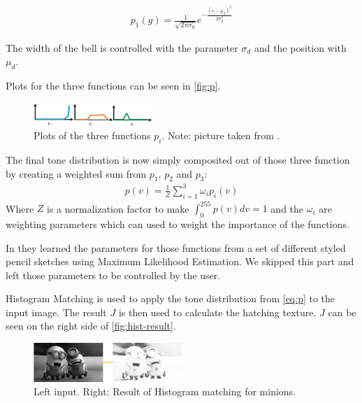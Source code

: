 \begin{align}
  p_1(g) = \frac{1}{\sqrt{2\pi \sigma_d}} e^{-\frac{(v-\mu_d)^2}{2\sigma_d^2}} 
  \label{eq:p_3}
\end{align}

The width of the bell is controlled with the parameter $\sigma_d$ and the
position with $\mu_d$.

Plots for the three functions can be seen in \autoref{fig:p}.

\begin{figure}[htb]
  \centering
  \includegraphics[width=0.4\textwidth]{images/p_i.png}
  \caption{Plots of the three functions $p_i$. Note: picture taken from
    \cite{mainPaper}.}
  \label{fig:p}
\end{figure}

The final tone distribution is now simply composited out of those three
function by creating a weighted sum from $p_1$, $p_2$ and $p_3$:
\begin{align}
  p(v) = \frac{1}{Z} \sum_{i=1}^{3}\omega_i p_i(v)
  \label{eq:p}
\end{align}
Where $Z$ is a normalization factor to make $\int_0^{255}p(v)dv = 1$ and the
$\omega_i$ are weighting parameters which can used to weight the importance of
the functions.

In \cite{mainPaper} they learned the parameters for those functions from a set
of different styled pencil sketches using Maximum Likelihood Estimation. We skipped this part and left those
parameters to be controlled by the user.

Histogram Matching is used to apply the tone distribution from \autoref{eq:p} to
the input image. The result $J$ is then used to calculate the hatching texture.
$J$ can be seen on the right side of \autoref{fig:hist-result}.

\begin{figure}[htb]
  \centering
  \includegraphics[width=0.5\textwidth]{images/tone-result.png}
  \caption{Left input. Right: Result of Histogram matching for minions.}
  \label{fig:hist-result}
\end{figure}

